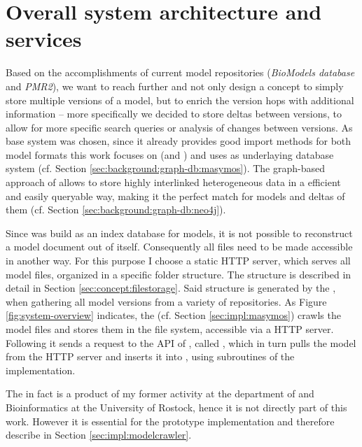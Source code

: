 \label{sec:concept}

\section{Overall system architecture and services}
\label{sec:concept:sysarchitecture}

Based on the accomplishments of current model repositories (\emph{BioModels database} and \emph{PMR2}), we want to reach further and not only design a concept to simply store multiple versions of a model, but to enrich the version hops with additional information -- more specifically we decided to store deltas between versions, to allow for more specific search queries or analysis of changes between versions.
As base system \masymos was chosen, since it already provides good import methods for both model formats this work focuses on (\sbml and \cellml) and uses \neoj as underlaying database system (cf. Section \ref{sec:background:graph-db:masymos}). The graph-based approach of \neoj allows to store highly interlinked heterogeneous data in a efficient and easily queryable way, making it the perfect match for \sysbio models and deltas of them (cf. Section \ref{sec:background:graph-db:neo4j}).  

Since \masymos was build as an index database for models, it is not possible to reconstruct a \xml model document out of \masymos itself. Consequently all files need to be made accessible in another way. For this purpose I choose a static HTTP server, which serves all model files, organized in a specific folder structure. The structure is described in detail in Section \ref{sec:concept:filestorage}.
Said structure is generated by the \modelcrawler, when gathering all model versions from a variety of repositories. As Figure \ref{fig:system-overview} indicates, the \modelcrawler (cf. Section \ref{sec:impl:masymos}) crawls the model files and stores them in the file system, accessible via a HTTP server. Following it sends a request to the \rest API of \masymos, called \morre, which in turn pulls the model from the HTTP server and inserts it into \neoj, using subroutines of the \masymos implementation.

The \modelcrawler in fact is a product of my former activity at the department of \sysbio and Bioinformatics at the University of Rostock, hence it is not directly part of this work. However it is essential for the prototype implementation and therefore describe in Section \ref{sec:impl:modelcrawler}.

